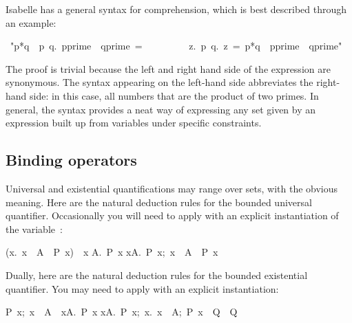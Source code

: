 Isabelle has a general syntax for comprehension, which is best 
described through an example: 
\begin{isabelle}
\ "{\isacharbraceleft}p*q\ \isacharbar\ p\ q.\ 
p{\isasymin}prime\ \isasymand\ q{\isasymin}prime\isacharbraceright\ =\ 
\isanewline
\ \ \ \ \ \ \ \ {\isacharbraceleft}z.\ {\isasymexists}p\ q.\ z\ =\ p*q\
\isasymand\ p{\isasymin}prime\ \isasymand\
q{\isasymin}prime\isacharbraceright"
\end{isabelle}
The proof is trivial because the left and right hand side 
of the expression are synonymous. The syntax appearing on the 
left-hand side abbreviates the right-hand side: in this case, all numbers
that are the product of two primes. In general,  the syntax provides a neat
way of expressing any set given by an expression built up from variables
under specific constraints. 



\subsection{Binding operators}

Universal and existential quantifications may range over sets, 
with the obvious meaning.  Here are the natural deduction rules for the
bounded universal quantifier.  Occasionally you will need to apply
 with an explicit instantiation of the variable~:
%
\begin{isabelle}
({\isasymAnd}x.\ x\ \isasymin\ A\ \isasymLongrightarrow\ P\ x)\ \isasymLongrightarrow\ {\isasymforall}x\isasymin
A.\ P\ x%
%
\isanewline
\isasymlbrakk{\isasymforall}x\isasymin A.\
P\ x;\ x\ \isasymin\
A\isasymrbrakk\ \isasymLongrightarrow\ P\
x%
\end{isabelle}
%
Dually, here are the natural deduction rules for the
bounded existential quantifier.  You may need to apply
\isa{bexI} with an explicit instantiation:
\begin{isabelle}
\isasymlbrakk P\ x;\
x\ \isasymin\ A\isasymrbrakk\
\isasymLongrightarrow\
{\isasymexists}x\isasymin A.\ P\
x%
\rulename{bexI}%
\isanewline
\isasymlbrakk{\isasymexists}x\isasymin A.\
P\ x;\ {\isasymAnd}x.\
{\isasymlbrakk}x\ \isasymin\ A;\
P\ x\isasymrbrakk\ \isasymLongrightarrow\
Q\isasymrbrakk\ \isasymLongrightarrow\ Q%
\rulename{bexE}
\end{isabelle}

